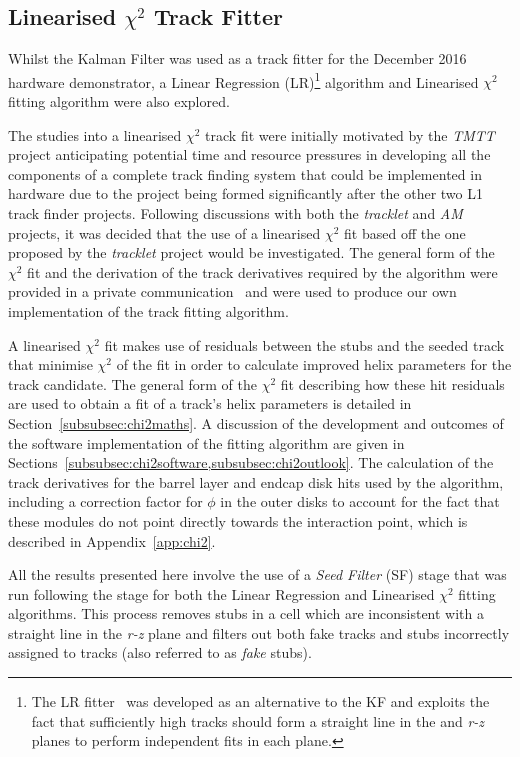\subsection{Linearised $\chi^{2}$ Track Fitter}\label{subsec:chi2}
Whilst the Kalman Filter was used as a track fitter for the December 2016 hardware demonstrator, a Linear Regression (LR)\footnote{The LR fitter~\cite{TMTT_FLP} was developed as an alternative to the KF and exploits the fact that sufficiently high \pT tracks should form a straight line in the \emph{\rphi} and \emph{r-z} planes to perform independent fits in each plane.} algorithm and Linearised $\chi^{2}$ fitting algorithm were also explored.

The studies into a linearised $\chi^{2}$ track fit were initially motivated by the \emph{TMTT} project anticipating potential time and resource pressures in developing all the components of a complete track finding system that could be implemented in hardware due to the project being formed significantly after the other two L1 track finder projects.
Following discussions with both the \emph{tracklet} and \emph{AM} projects, it was decided that the use of a linearised $\chi^{2}$ fit based off the one proposed by the \emph{tracklet} project would be investigated.
The general form of the $\chi^{2}$ fit and the derivation of the track derivatives required by the algorithm were provided in a private communication~\cite{CMS_DN-14-043} and were used to produce our own implementation of the track fitting algorithm.

A linearised $\chi^{2}$ fit makes use of residuals between the stubs and the seeded track that minimise $\chi^{2}$ of the fit in order to calculate improved helix parameters for the track candidate.
The general form of the $\chi^{2}$ fit describing how these hit residuals are used to obtain a fit of a track's helix parameters is detailed in Section~\ref{subsubsec:chi2maths}.
A discussion of the development and outcomes of the software implementation of the fitting algorithm are given in Sections~\ref{subsubsec:chi2software,subsubsec:chi2outlook}.
The calculation of the track derivatives for the barrel layer and endcap disk hits used by the algorithm, including a correction factor for $\phi$ in the outer disks to account for the fact that these modules do not point directly towards the interaction point, which is described in Appendix~\ref{app:chi2}.

All the results presented here involve the use of a \emph{Seed Filter} (SF) stage that was run following the \HT stage for both the Linear Regression and Linearised $\chi^{2}$ fitting algorithms.
This process removes stubs in a \HT cell which are inconsistent with a straight line in the \emph{r-z} plane and filters out both fake tracks and stubs incorrectly assigned to tracks (also referred to as \emph{fake} stubs).

